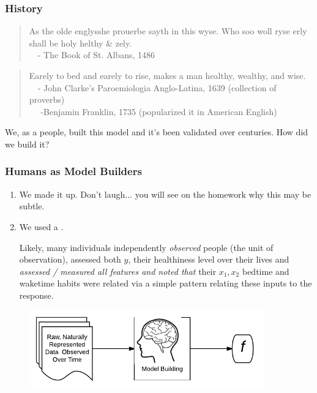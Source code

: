 \documentclass[handout]{beamer}
\begin{document}
\begin{frame}\frametitle{History}

\begin{quotation}
As the olde englysshe prouerbe sayth in this wyse. Who soo woll ryse erly shall be holy helthy \& zely.\\
~~- The Book of St. Albans, 1486
\end{quotation}
	
\begin{quotation}
Earely to bed and earely to rise, makes a man healthy, wealthy, and wise. \\
~~- John Clarke's Paroemiologia Anglo-Latina, 1639 (collection of proverbs) \\
~~ -Benjamin Franklin, 1735 (popularized it in American English)
\end{quotation}

We, as a people, built this model and it's been validated over centuries. How did we build it?

\end{frame}

\begin{frame}\frametitle{Humans as Model Builders}

\begin{enumerate}
\item We made it up. Don't laugh... you will see on the homework why this may be subtle. \pause 
\item We used a . \\ \pause 

Likely, many individuals independently \textit{observed} people (the unit of observation), assessed both $y$, their healthiness level over their lives and \emph{assessed / measured all features and noted that} their $x_1, x_2$ bedtime and waketime habits were related via a simple pattern relating these inputs to the response. \pause 
\end{enumerate}

\begin{figure}
\centering
\includegraphics[width=4in]{human_learning}
\end{figure}
	
\end{frame}
\end{document}
